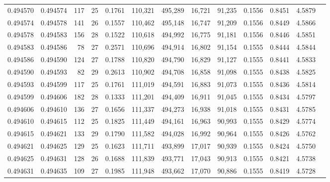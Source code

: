 \begin{tabular}{rrrrrrrrrrrrr}
0.494570 & 0.494574 & 117 &  25 &                                     0.1761 & 110,321 & 495,289 &  16,721 &  91,235 & 0.1556 & 0.8451 & 4.5879 \\
0.494574 & 0.494578 & 141 &  26 &                                     0.1557 & 110,462 & 495,148 &  16,747 &  91,209 & 0.1556 & 0.8449 & 4.5866 \\
0.494578 & 0.494583 & 156 &  28 &                                     0.1522 & 110,618 & 494,992 &  16,775 &  91,181 & 0.1556 & 0.8446 & 4.5851 \\
0.494583 & 0.494586 &  78 &  27 &                                     0.2571 & 110,696 & 494,914 &  16,802 &  91,154 & 0.1555 & 0.8444 & 4.5844 \\
0.494586 & 0.494590 & 124 &  27 &                                     0.1788 & 110,820 & 494,790 &  16,829 &  91,127 & 0.1555 & 0.8441 & 4.5833 \\
0.494590 & 0.494593 &  82 &  29 &                                     0.2613 & 110,902 & 494,708 &  16,858 &  91,098 & 0.1555 & 0.8438 & 4.5825 \\
0.494593 & 0.494599 & 117 &  25 &                                     0.1761 & 111,019 & 494,591 &  16,883 &  91,073 & 0.1555 & 0.8436 & 4.5814 \\
0.494599 & 0.494606 & 182 &  28 &                                     0.1333 & 111,201 & 494,409 &  16,911 &  91,045 & 0.1555 & 0.8434 & 4.5797 \\
0.494606 & 0.494610 & 136 &  27 &                                     0.1656 & 111,337 & 494,273 &  16,938 &  91,018 & 0.1555 & 0.8431 & 4.5785 \\
0.494610 & 0.494615 & 112 &  25 &                                     0.1825 & 111,449 & 494,161 &  16,963 &  90,993 & 0.1555 & 0.8429 & 4.5774 \\
0.494615 & 0.494621 & 133 &  29 &                                     0.1790 & 111,582 & 494,028 &  16,992 &  90,964 & 0.1555 & 0.8426 & 4.5762 \\
0.494621 & 0.494625 & 129 &  25 &                                     0.1623 & 111,711 & 493,899 &  17,017 &  90,939 & 0.1555 & 0.8424 & 4.5750 \\
0.494625 & 0.494631 & 128 &  26 &                                     0.1688 & 111,839 & 493,771 &  17,043 &  90,913 & 0.1555 & 0.8421 & 4.5738 \\
0.494631 & 0.494635 & 109 &  27 &                                     0.1985 & 111,948 & 493,662 &  17,070 &  90,886 & 0.1555 & 0.8419 & 4.5728 \\

\end{tabular}

